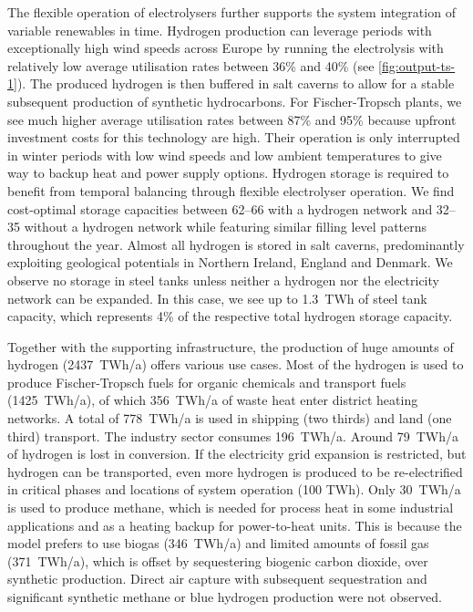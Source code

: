 
The flexible operation of electrolysers further supports the system integration
of variable renewables in time. Hydrogen production can leverage periods with
exceptionally high wind speeds across Europe by running the electrolysis with
relatively low average utilisation rates between 36\% and 40\% (see
\cref{fig:output-ts-1}). The produced hydrogen is then buffered in salt caverns
to allow for a stable subsequent production of synthetic hydrocarbons. For
Fischer-Tropsch plants, we see much higher average utilisation rates between
87\% and 95\% because upfront investment costs for this technology are high.
Their operation is only interrupted in winter periods with low wind speeds and
low ambient temperatures to give way to backup heat and power supply options.
Hydrogen storage is required to benefit from temporal balancing through flexible
electrolyser operation. We find cost-optimal storage capacities between
\SIrange{62}{66}{\twh} with a hydrogen network and \SIrange{32}{35}{\twh}
without a hydrogen network while featuring similar filling level patterns
throughout the year. Almost all hydrogen is stored in salt caverns,
predominantly exploiting geological potentials in Northern Ireland, England and
Denmark. We observe no storage in steel tanks unless neither a hydrogen nor the
electricity network can be expanded. In this case, we see up to 1.3~TWh of steel
tank capacity, which represents 4\% of the respective total hydrogen storage
capacity.



Together with the supporting infrastructure, the production of huge amounts of
hydrogen (2437~TWh/a) offers various use cases. Most of the hydrogen is used to
produce Fischer-Tropsch fuels for organic chemicals and transport fuels
(1425~TWh/a), of which 356~TWh/a of waste heat enter district heating networks.
A total of 778~TWh/a is used in shipping (two thirds) and land (one third)
transport. The industry sector consumes 196~TWh/a. Around 79~TWh/a of hydrogen
is lost in conversion. If the electricity grid expansion is restricted, but
hydrogen can be transported, even more hydrogen is produced to be re-electrified
in critical phases and locations of system operation (100 TWh\el).
Only 30~TWh/a is used to produce methane, which is needed for process heat in
some industrial applications and as a heating backup for power-to-heat units.
This is because the model prefers to use biogas (346~TWh/a) and limited amounts
of fossil gas (371~TWh/a), which is offset by sequestering biogenic carbon
dioxide, over synthetic production. Direct air capture with subsequent
sequestration and significant synthetic methane or blue hydrogen production were
not observed.

